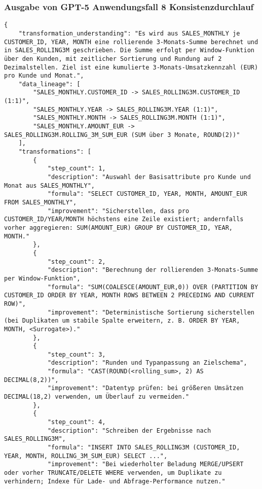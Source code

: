 \subsubsection{Ausgabe von GPT-5 Anwendungsfall 8 Konsistenzdurchlauf}\label{anhang:subsubsec:gpt_case8_prompt2}
\begin{lstlisting}[caption={Ausgabe: GPT-5 Anwendungsfall 8 Konsistenzdurchlauf},label={gpt_case8_prompt2}]
{
    "transformation_understanding": "Es wird aus SALES_MONTHLY je CUSTOMER_ID, YEAR, MONTH eine rollierende 3-Monats-Summe berechnet und in SALES_ROLLING3M geschrieben. Die Summe erfolgt per Window-Funktion über den Kunden, mit zeitlicher Sortierung und Rundung auf 2 Dezimalstellen. Ziel ist eine kumulierte 3-Monats-Umsatzkennzahl (EUR) pro Kunde und Monat.",
    "data_lineage": [
        "SALES_MONTHLY.CUSTOMER_ID -> SALES_ROLLING3M.CUSTOMER_ID (1:1)",
        "SALES_MONTHLY.YEAR -> SALES_ROLLING3M.YEAR (1:1)",
        "SALES_MONTHLY.MONTH -> SALES_ROLLING3M.MONTH (1:1)",
        "SALES_MONTHLY.AMOUNT_EUR -> SALES_ROLLING3M.ROLLING_3M_SUM_EUR (SUM über 3 Monate, ROUND(2))"
    ],
    "transformations": [
        {
            "step_count": 1,
            "description": "Auswahl der Basisattribute pro Kunde und Monat aus SALES_MONTHLY",
            "formula": "SELECT CUSTOMER_ID, YEAR, MONTH, AMOUNT_EUR FROM SALES_MONTHLY",
            "improvement": "Sicherstellen, dass pro CUSTOMER_ID/YEAR/MONTH höchstens eine Zeile existiert; andernfalls vorher aggregieren: SUM(AMOUNT_EUR) GROUP BY CUSTOMER_ID, YEAR, MONTH."
        },
        {
            "step_count": 2,
            "description": "Berechnung der rollierenden 3-Monats-Summe per Window-Funktion",
            "formula": "SUM(COALESCE(AMOUNT_EUR,0)) OVER (PARTITION BY CUSTOMER_ID ORDER BY YEAR, MONTH ROWS BETWEEN 2 PRECEDING AND CURRENT ROW)",
            "improvement": "Deterministische Sortierung sicherstellen (bei Duplikaten um stabile Spalte erweitern, z. B. ORDER BY YEAR, MONTH, <Surrogate>)."
        },
        {
            "step_count": 3,
            "description": "Runden und Typanpassung an Zielschema",
            "formula": "CAST(ROUND(<rolling_sum>, 2) AS DECIMAL(8,2))",
            "improvement": "Datentyp prüfen: bei größeren Umsätzen DECIMAL(18,2) verwenden, um Überlauf zu vermeiden."
        },
        {
            "step_count": 4,
            "description": "Schreiben der Ergebnisse nach SALES_ROLLING3M",
            "formula": "INSERT INTO SALES_ROLLING3M (CUSTOMER_ID, YEAR, MONTH, ROLLING_3M_SUM_EUR) SELECT ...",
            "improvement": "Bei wiederholter Beladung MERGE/UPSERT oder vorher TRUNCATE/DELETE WHERE verwenden, um Duplikate zu verhindern; Indexe für Lade- und Abfrage-Performance nutzen."

\end{lstlisting}

